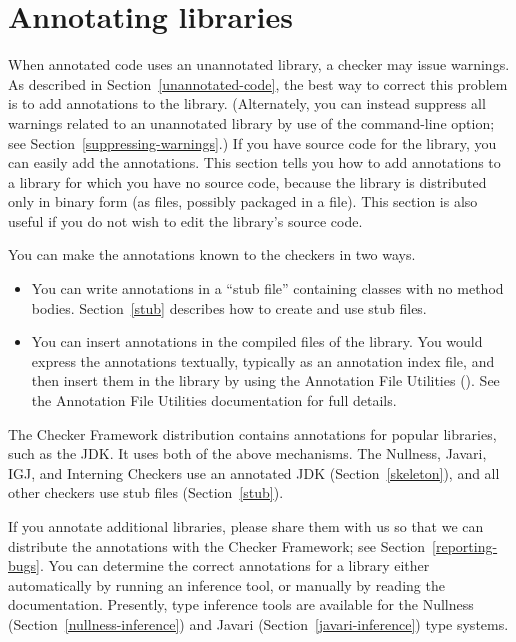 \htmlhr
\chapter{Annotating libraries\label{annotating-libraries}}

When annotated code uses an unannotated library, a checker may issue warnings.
As described in Section~\ref{unannotated-code}, the best way to correct
this problem is to add annotations to the library.  (Alternately, you can instead
suppress all warnings related to an unannotated library by use of the
 command-line option; see
Section~\ref{suppressing-warnings}.)  If you have source code for the
library, you can easily add the annotations.
This section tells you
how to add annotations to a library for which you have no source code,
because the library is distributed only in binary form
(as  files, possibly packaged in a  file).
This section is also useful if you do not wish to edit the
library's source code.

You can make the annotations known to the checkers in two ways.

\begin{itemize}

\item
  You can write annotations in a ``stub
  file'' containing classes with no method bodies.
  Section~\ref{stub} describes how to create and use stub files.

\item
  You can insert annotations in the compiled
   files of the library.
  You would express the annotations textually, typically as an annotation index file, and
  then insert them in the library by using the Annotation File Utilities
  ().
  See the Annotation File Utilities documentation for full details.

\end{itemize}

The Checker Framework distribution contains annotations for popular
libraries, such as the JDK\@.  It uses both of the above mechanisms.  The
Nullness, Javari, IGJ, and Interning Checkers use an annotated JDK
(Section~\ref{skeleton}), and all other checkers use stub files
(Section~\ref{stub}).

If you annotate additional libraries, please share them with us so that we
can distribute the annotations with the Checker Framework; see
Section~\ref{reporting-bugs}.
You can determine the correct annotations for a library either
automatically by running an inference tool, or manually by reading the
documentation.  Presently, type inference tools are available for the
Nullness (Section~\ref{nullness-inference}) and Javari
(Section~\ref{javari-inference}) type systems.


